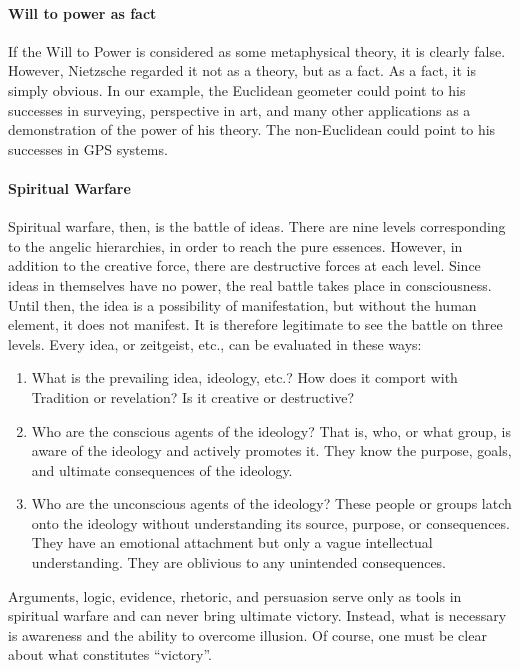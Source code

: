 \paragraph{Will to power as fact}


If the Will to Power is considered as some metaphysical theory, it is clearly false. However, Nietzsche regarded it not as a theory, but as a fact. As a fact, it is simply obvious. In our example, the Euclidean geometer could point to his successes in surveying, perspective in art, and many other applications as a demonstration of the power of his theory. The non-Euclidean could point to his successes in GPS systems.

\paragraph{Spiritual Warfare}


Spiritual warfare, then, is the battle of ideas. There are nine levels corresponding to the angelic hierarchies, in order to reach the pure essences. However, in addition to the creative force, there are destructive forces at each level. Since ideas in themselves have no power, the real battle takes place in consciousness. Until then, the idea is a possibility of manifestation, but without the human element, it does not manifest. It is therefore legitimate to see the battle on three levels. Every idea, or zeitgeist, etc., can be evaluated in these ways:

\begin{enumerate}


\item What is the prevailing idea, ideology, etc.? How does it comport with Tradition or revelation? Is it creative or destructive?

\item Who are the conscious agents of the ideology? That is, who, or what group, is aware of the ideology and actively promotes it. They know the purpose, goals, and ultimate consequences of the ideology.

\item Who are the unconscious agents of the ideology? These people or groups latch onto the ideology without understanding its source, purpose, or consequences. They have an emotional attachment but only a vague intellectual understanding. They are oblivious to any unintended consequences.
\end{enumerate}


Arguments, logic, evidence, rhetoric, and persuasion serve only as tools in spiritual warfare and can never bring ultimate victory. Instead, what is necessary is awareness and the ability to overcome illusion. Of course, one must be clear about what constitutes ``victory''.



